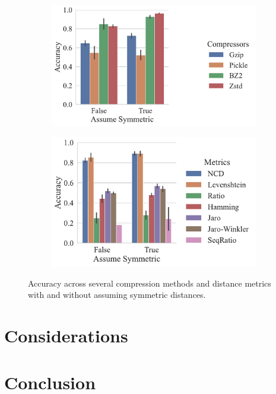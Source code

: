 \documentclass[sigconf]{acmart}
\begin{document}
\begin{figure}
    \begin{subfigure}
        \centering
        \includegraphics[width=.36\textwidth]{figs/kdd_nsl/symmetric_vs_compressor.pdf}
    \end{subfigure}
    \begin{subfigure}
        \centering
        \includegraphics[width=.36\textwidth]{figs/kdd_nsl/symmetric_vs_metric.pdf}
    \end{subfigure}
    \caption{Accuracy across several compression methods and distance metrics with and without assuming symmetric distances.}
    \label{fig:symmetry_kdd}
\end{figure}

\label{results}
\section{Considerations}
\label{considerations}
\section{Conclusion}
\label{conclusion}



\clearpage

\end{document}
